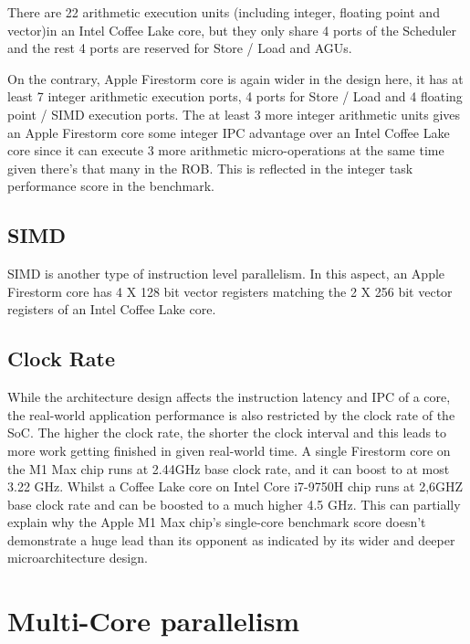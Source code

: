 \documentclass[11pt]{article}
\begin{document}
There are 22 arithmetic execution units (including integer, floating point and vector)in an Intel Coffee Lake core, but they only share 4 ports of the Scheduler and the rest 4 ports are reserved for Store / Load and AGUs.

On the contrary, Apple Firestorm core is again wider in the design here, it has at least 7 integer arithmetic execution ports, 4 ports for Store / Load and 4 floating point / SIMD execution ports. The at least 3 more integer arithmetic units gives an Apple Firestorm core some integer IPC advantage over an Intel Coffee Lake core since it can execute 3 more arithmetic micro-operations at the same time given there’s that many in the ROB. This is reflected in the integer task performance score in the benchmark.
\subsection*{SIMD}
SIMD is another type of instruction level parallelism. In this aspect, an Apple Firestorm core has 4 X 128 bit vector registers matching the 2 X 256 bit vector registers of an Intel Coffee Lake core.
\subsection*{Clock Rate}
While the architecture design affects the instruction latency and IPC of a core, the real-world application performance is also restricted by the clock rate of the SoC. The higher the clock rate, the shorter the clock interval and this leads to more work getting finished in given real-world time.
A single Firestorm core on the M1 Max chip runs at 2.44GHz base clock rate, and it can boost to at most 3.22 GHz. Whilst a Coffee Lake core on Intel Core i7-9750H chip runs at 2,6GHZ base clock rate and can be boosted to a much higher 4.5 GHz. This can partially explain why the Apple M1 Max chip’s single-core benchmark score doesn’t demonstrate a huge lead than its opponent as indicated by its wider and deeper microarchitecture design.
\section{Multi-Core parallelism}
\end{document}
